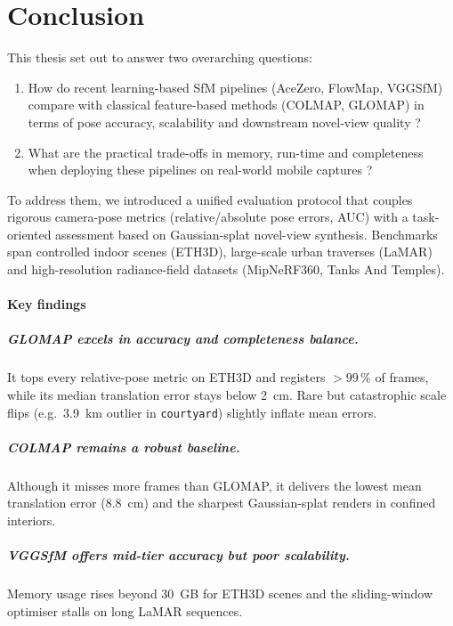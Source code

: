 \chapter{Conclusion}\label{chap:conclusion}
This thesis set out to answer two overarching questions:

\begin{enumerate}
    \item How do recent learning-based SfM pipelines (AceZero, FlowMap, VGGSfM) compare with classical feature-based methods (COLMAP, GLOMAP) in terms of pose accuracy, scalability and downstream novel-view quality ?
    \item What are the practical trade-offs in memory, run-time and completeness when deploying these pipelines on real-world mobile captures ?
\end{enumerate}

To address them, we introduced a unified evaluation protocol that couples rigorous camera-pose metrics (relative/absolute pose errors, AUC) with a task-oriented assessment based on Gaussian-splat novel-view synthesis.  
Benchmarks span controlled indoor scenes (ETH3D), large-scale urban traverses (LaMAR) and high-resolution radiance-field datasets (MipNeRF360, Tanks And Temples).

\subsubsection{Key findings}
\paragraph{GLOMAP excels in accuracy and completeness balance.}
It tops every relative-pose metric on ETH3D and registers $>99\,\%$ of frames, while its median translation error stays below \SI{2}{cm}.  
Rare but catastrophic scale flips (e.g.\ \SI{3.9}{km} outlier in \texttt{courtyard}) slightly inflate mean errors.

\paragraph{COLMAP remains a robust baseline.}
Although it misses more frames than GLOMAP, it delivers the lowest mean translation error (\SI{8.8}{cm}) and the sharpest Gaussian-splat renders in confined interiors.

\paragraph{VGGSfM offers mid-tier accuracy but poor scalability.}
Memory usage rises beyond \SI{30}{GB} for ETH3D scenes and the sliding-window optimiser stalls on long LaMAR sequences.

